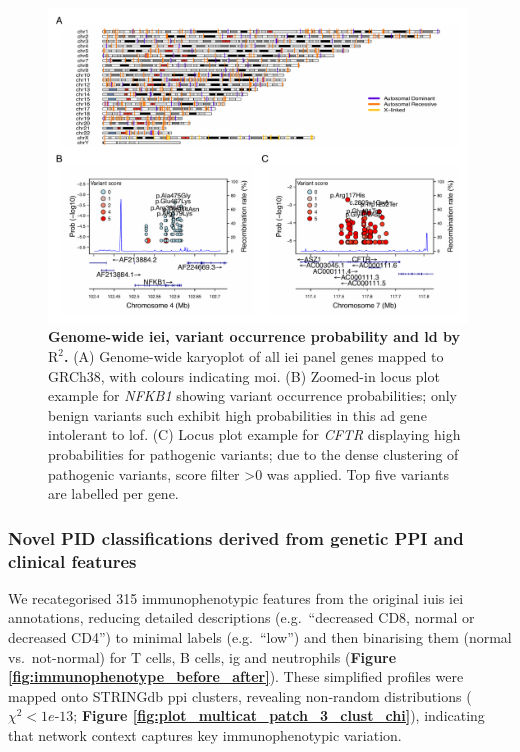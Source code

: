 \begin{figure}[ht]
  \centering
  \includegraphics[width=0.99\textwidth]{../images/karyo_locusplot_merged.pdf}
  \caption{\textbf{Genome-wide \ac{iei}, variant occurrence probability and \ac{ld} by $\text{R}^2$.} (A) Genome-wide karyoplot of all \ac{iei} panel genes mapped to GRCh38, with colours indicating \ac{moi}. (B) Zoomed-in locus plot example for \textit{NFKB1} showing variant occurrence probabilities; only benign variants such exhibit high probabilities in this \ac{ad} gene intolerant to \ac{lof}. (C) Locus plot example for \textit{CFTR} displaying high probabilities for pathogenic variants; due to the dense clustering of pathogenic variants, score filter >0 was applied. Top five variants are labelled per gene.}
  \label{fig:karyo_locusplot_merged}
\end{figure}

\FloatBarrier
\subsubsection{Novel PID classifications derived from genetic PPI and clinical features}
We recategorised 315 immunophenotypic features from the original \ac{iuis} \ac{iei} annotations, reducing detailed descriptions (e.g.\ “decreased CD8, normal or decreased CD4”) to minimal labels (e.g.\ “low”) and then binarising them (normal vs.\ not-normal) for T cells, B cells, \ac{ig} and neutrophils 
(\textbf{Figure \ref{fig:immunophenotype_before_after}}). 
These simplified profiles were mapped onto STRINGdb \ac{ppi} clusters, revealing non‑random distributions ($\chi^2 < 1e‑13$; 
\textbf{Figure \ref{fig:plot_multicat_patch_3_clust_chi}}), indicating that network context captures key immunophenotypic variation.

